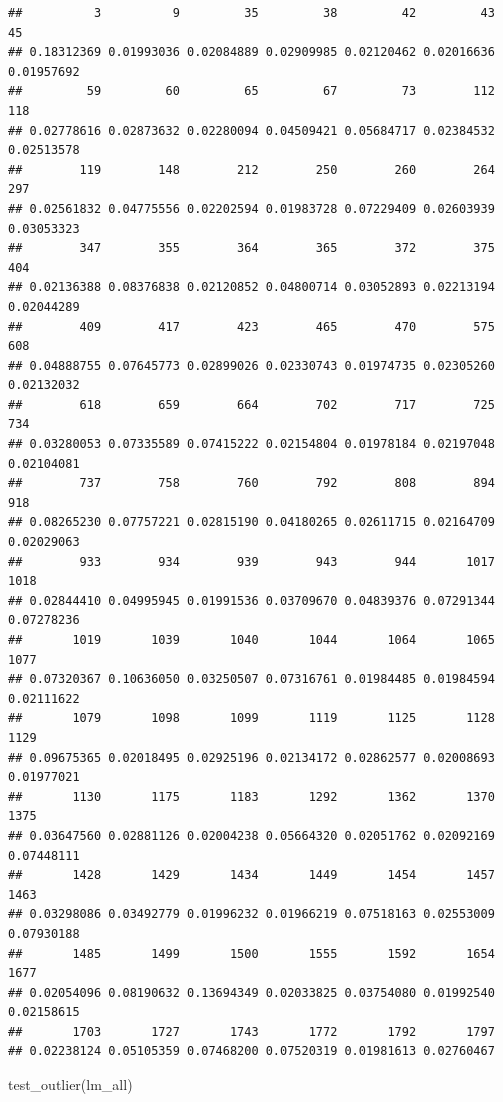 \documentclass[
]{article}
\newenvironment{Shaded}{\begin{snugshade}}{\end{snugshade}}
\newcommand{\FunctionTok}[1]{\textcolor[rgb]{0.00,0.00,0.00}{#1}}
\newcommand{\NormalTok}[1]{#1}
\begin{document}
\begin{verbatim}
##          3          9         35         38         42         43         45 
## 0.18312369 0.01993036 0.02084889 0.02909985 0.02120462 0.02016636 0.01957692 
##         59         60         65         67         73        112        118 
## 0.02778616 0.02873632 0.02280094 0.04509421 0.05684717 0.02384532 0.02513578 
##        119        148        212        250        260        264        297 
## 0.02561832 0.04775556 0.02202594 0.01983728 0.07229409 0.02603939 0.03053323 
##        347        355        364        365        372        375        404 
## 0.02136388 0.08376838 0.02120852 0.04800714 0.03052893 0.02213194 0.02044289 
##        409        417        423        465        470        575        608 
## 0.04888755 0.07645773 0.02899026 0.02330743 0.01974735 0.02305260 0.02132032 
##        618        659        664        702        717        725        734 
## 0.03280053 0.07335589 0.07415222 0.02154804 0.01978184 0.02197048 0.02104081 
##        737        758        760        792        808        894        918 
## 0.08265230 0.07757221 0.02815190 0.04180265 0.02611715 0.02164709 0.02029063 
##        933        934        939        943        944       1017       1018 
## 0.02844410 0.04995945 0.01991536 0.03709670 0.04839376 0.07291344 0.07278236 
##       1019       1039       1040       1044       1064       1065       1077 
## 0.07320367 0.10636050 0.03250507 0.07316761 0.01984485 0.01984594 0.02111622 
##       1079       1098       1099       1119       1125       1128       1129 
## 0.09675365 0.02018495 0.02925196 0.02134172 0.02862577 0.02008693 0.01977021 
##       1130       1175       1183       1292       1362       1370       1375 
## 0.03647560 0.02881126 0.02004238 0.05664320 0.02051762 0.02092169 0.07448111 
##       1428       1429       1434       1449       1454       1457       1463 
## 0.03298086 0.03492779 0.01996232 0.01966219 0.07518163 0.02553009 0.07930188 
##       1485       1499       1500       1555       1592       1654       1677 
## 0.02054096 0.08190632 0.13694349 0.02033825 0.03754080 0.01992540 0.02158615 
##       1703       1727       1743       1772       1792       1797 
## 0.02238124 0.05105359 0.07468200 0.07520319 0.01981613 0.02760467
\end{verbatim}

\begin{Shaded}
\begin{Highlighting}[]
\FunctionTok{test\_outlier}\NormalTok{(lm\_all)}
\end{Highlighting}
\end{Shaded}
\end{document}
